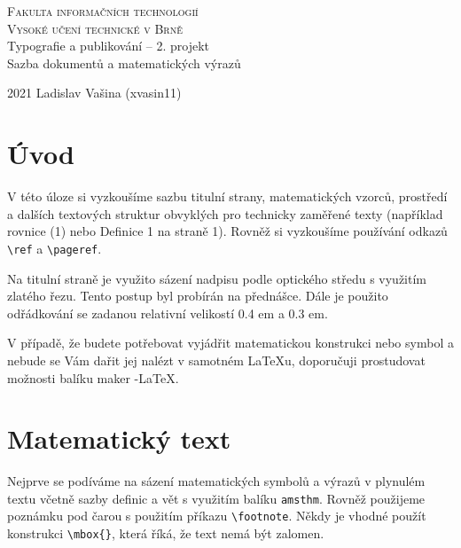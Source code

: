 \documentclass[a4paper, 11pt]{article}
\begin{document}
\begin{titlepage}
\begin{center}
\thispagestyle{empty}
{\Huge
\textsc{Fakulta informačních technologií\\ 
\vspace{4mm}
Vysoké učení technické v Brně }}\\
{\LARGE Typografie a publikování – 2. projekt\\
\vspace{2mm}
Sazba dokumentů a matematických výrazů}\\
\end{center}
{\Large 2021 \hfill Ladislav Vašina (xvasin11)}
\end{titlepage}

\twocolumn

\section*{Úvod}
V této úloze si vyzkoušíme sazbu titulní strany, matematic\-kých vzorců, prostředí a dalších textových struktur obvyklých pro technicky zaměřené texty (například rovnice (1) nebo Definice 1 na straně 1). Rovněž si vyzkoušíme používání odkazů {\verb!\ref!} a {\verb!\pageref!}.

    Na titulní straně je využito sázení nadpisu podle optického středu s využitím zlatého řezu. Tento postup byl
probírán na přednášce. Dále je použito odřádkování se zadanou relativní velikostí 0.4 em a 0.3 em.

    V případě, že budete potřebovat vyjádřit ma\-tematickou konstrukci nebo symbol a nebude se Vám dařit jej nalézt
v samotném \LaTeX u, doporučuji prostudovat možnosti balíku maker \AmS-\LaTeX.

\section{Matematický text}
Nejprve se podíváme na sázení matematických symbolů
a výrazů v plynulém textu včetně sazby definic a vět s vy\-užitím balíku \texttt{amsthm}. Rovněž použijeme poznámku pod
čarou s použitím příkazu {\verb!\footnote!}. Někdy je vhodné
použít konstrukci {\verb!\mbox{}!}, která říká, že text nemá být
zalomen.
\end{document}
